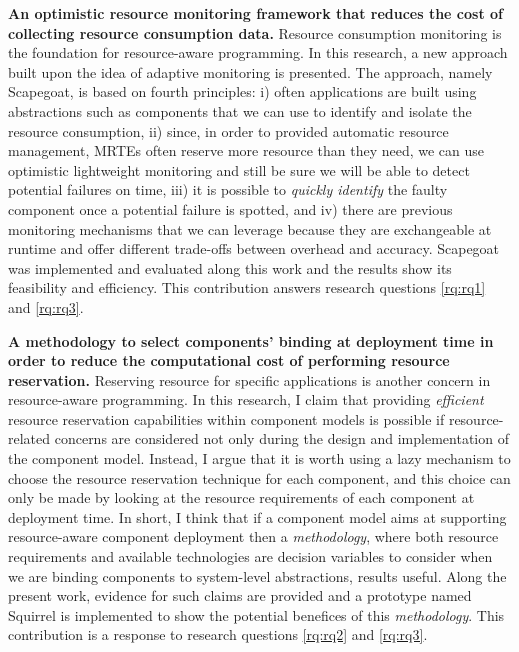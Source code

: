 \textbf{An optimistic resource monitoring framework that reduces the cost of collecting resource consumption data.}
Resource consumption monitoring is the foundation for resource-aware programming.
In this research, a new approach built upon the idea of adaptive monitoring is presented.
The approach, namely Scapegoat, is based on fourth principles: i) often applications are built using abstractions such as components that we can use to identify and isolate the resource consumption, ii) since, in order to provided automatic resource management, MRTEs often reserve more resource than they need, we can use optimistic lightweight monitoring and still be sure we will be able to detect potential failures on time, iii) it is possible to \textit{quickly identify} the faulty component once a potential failure is spotted, and iv) there are previous monitoring mechanisms that we can leverage because they are exchangeable at runtime and offer different trade-offs between overhead and accuracy.
Scapegoat was implemented and evaluated along this work and the results show its feasibility and efficiency.
This contribution answers research questions \ref{rq:rq1} and \ref{rq:rq3}.

\textbf{A methodology to select components' binding at deployment time in order to reduce the computational cost of performing resource reservation.}
Reserving resource for specific applications is another concern in resource-aware programming.
In this research, I claim that providing \textit{efficient} resource reservation capabilities within component models is possible if resource-related concerns are considered not only during the design and implementation of the component model.
Instead, I argue that it is worth using a lazy mechanism to choose the resource reservation technique for each component, and this choice can only be made by looking at the resource requirements of each component at deployment time.
In short, I think that if a component model aims at supporting resource-aware component deployment then a \textit{methodology}, where both resource requirements and available technologies are decision variables to consider when we are binding components to system-level abstractions, results useful.
Along the present work, evidence for such claims are provided and a prototype named Squirrel is implemented to show the potential benefices of this \textit{methodology}.
This contribution is a response to research questions \ref{rq:rq2} and \ref{rq:rq3}.

